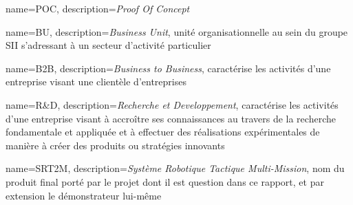 {
	name={POC},
	description={\emph{Proof Of Concept}}
}

{
	name={BU},
	description={\emph{Business Unit}, unité organisationnelle au sein du groupe SII s'adressant à un secteur d'activité particulier}
}

{
	name={B2B},
	description={\emph{Business to Business}, caractérise les activités d'une entreprise visant une clientèle d'entreprises}
}

{
	name={R\&D},
	description={\emph{Recherche et Developpement}, caractérise les activités d'une entreprise visant à accroître ses connaissances au travers de la recherche fondamentale et appliquée et à effectuer des réalisations expérimentales de manière à créer des produits ou stratégies innovants}
}

{
	name={SRT2M},
	description={\emph{Système Robotique Tactique Multi-Mission}, nom du produit final porté par le projet dont il est question dans ce rapport, et par extension le démonstrateur lui-même}
}
